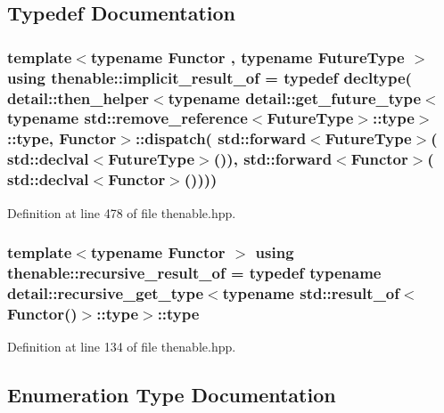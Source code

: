 \subsection{Typedef Documentation}
\subsubsection[{\texorpdfstring{implicit\+\_\+result\+\_\+of}{implicit_result_of}}]{\setlength{\rightskip}{0pt plus 5cm}template$<$typename Functor , typename Future\+Type $>$ using {\bf thenable\+::implicit\+\_\+result\+\_\+of} = typedef decltype( detail\+::then\+\_\+helper$<$typename detail\+::get\+\_\+future\+\_\+type$<$typename std\+::remove\+\_\+reference$<$Future\+Type$>$\+::type$>$\+::type, Functor$>$\+::dispatch( std\+::forward$<$Future\+Type$>$( std\+::declval$<$Future\+Type$>$()), std\+::forward$<$Functor$>$( std\+::declval$<$Functor$>$())))}\hypertarget{namespacethenable_a1ecf08d6ad8b8688d7b4df047b5feaae}{}\label{namespacethenable_a1ecf08d6ad8b8688d7b4df047b5feaae}


Definition at line 478 of file thenable.\+hpp.

\subsubsection[{\texorpdfstring{recursive\+\_\+result\+\_\+of}{recursive_result_of}}]{\setlength{\rightskip}{0pt plus 5cm}template$<$typename Functor $>$ using {\bf thenable\+::recursive\+\_\+result\+\_\+of} = typedef typename detail\+::recursive\+\_\+get\+\_\+type$<$typename std\+::result\+\_\+of$<$Functor()$>$\+::type$>$\+::type}\hypertarget{namespacethenable_a71ee91c31ba9c80bb2d6f3effe4bae12}{}\label{namespacethenable_a71ee91c31ba9c80bb2d6f3effe4bae12}


Definition at line 134 of file thenable.\+hpp.



\subsection{Enumeration Type Documentation}

